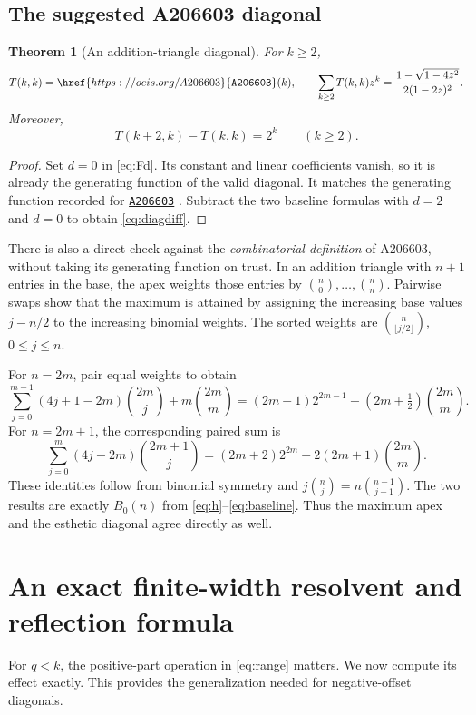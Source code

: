 \documentclass[11pt,letterpaper]{article}
\numberwithin{equation}{section}
\newtheorem{theorem}{Theorem}[section]
\theoremstyle{definition}
\newcommand{\OEIS}[1]{\href{https://oeis.org/#1}{\texttt{#1}}}
\begin{document}
\subsection{The suggested A206603 diagonal}
\begin{theorem}[An addition-triangle diagonal]\label{thm:A206603}
For $k\ge2$,
\begin{equation}\label{eq:A206}
T(k,k)=\OEIS{A206603}(k),\qquad
\sum_{k\ge2}T(k,k)z^k
=\frac{1-\sqrt{1-4z^2}}{2(1-2z)^2}.
\end{equation}
Moreover,
\begin{equation}\label{eq:diagdiff}
T(k+2,k)-T(k,k)=2^k\qquad(k\ge2).
\end{equation}
\end{theorem}
\begin{proof}
Set $d=0$ in \eqref{eq:Fd}.  Its constant and linear coefficients vanish,
so it is already the generating function of the valid diagonal.
It matches the generating function recorded for \OEIS{A206603}
\cite{oeis206603}.  Subtract the two baseline formulas with $d=2$ and
$d=0$ to obtain \eqref{eq:diagdiff}.
\end{proof}

There is also a direct check against the \emph{combinatorial definition}
of A206603, without taking its generating function on trust.  In an
addition triangle with $n+1$ entries in the base, the apex weights those
entries by $\binom n0,\ldots,\binom nn$.  Pairwise swaps show that the
maximum is attained by assigning the increasing base values
$j-n/2$ to the increasing binomial weights.  The sorted weights are
$\binom n{\lfloor j/2\rfloor}$, $0\le j\le n$.

For $n=2m$, pair equal weights to obtain
\[
\sum_{j=0}^{m-1}(4j+1-2m)\binom{2m}{j}
+m\binom{2m}{m}
=(2m+1)2^{2m-1}-(2m+\tfrac12)\binom{2m}{m}.
\]
For $n=2m+1$, the corresponding paired sum is
\[
\sum_{j=0}^{m}(4j-2m)\binom{2m+1}{j}
=(2m+2)2^{2m}-2(2m+1)\binom{2m}{m}.
\]
These identities follow from binomial symmetry and
$j\binom nj=n\binom{n-1}{j-1}$.  The two results are exactly $B_0(n)$
from \eqref{eq:h}--\eqref{eq:baseline}.  Thus the maximum apex and the
esthetic diagonal agree directly as well.

\section{An exact finite-width resolvent and reflection formula}
\label{sec:resolvent}

For $q<k$, the positive-part operation in \eqref{eq:range} matters.
We now compute its effect exactly.  This provides the generalization
needed for negative-offset diagonals.
\end{document}
